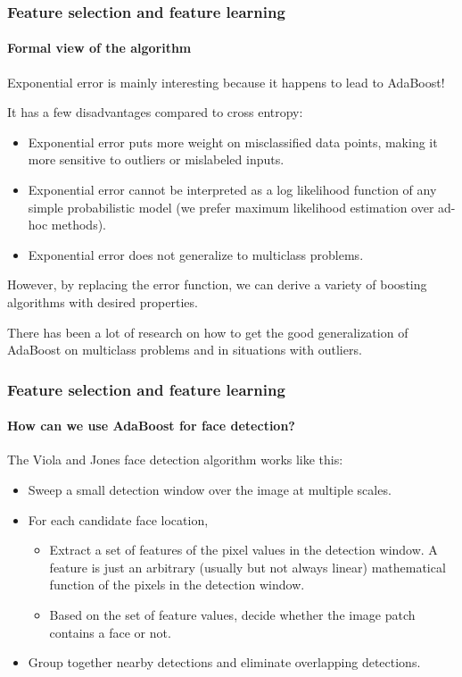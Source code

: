 \documentclass[aspectratio=169]{beamer}
\begin{document}
\begin{frame}
\frametitle{Feature selection and feature learning}
\framesubtitle{Formal view of the algorithm}

Exponential error is mainly interesting because it happens to lead to
AdaBoost!

\medskip

It has a few disadvantages compared to cross entropy:
\begin{itemize}
\item Exponential error puts \alert{more weight} on misclassified data
  points, making it \alert{more sensitive} to outliers or mislabeled
  inputs.
\item Exponential error \alert{cannot} be interpreted as a \alert{log
    likelihood} function of any simple probabilistic model (we prefer
  maximum likelihood estimation over ad-hoc methods).
\item Exponential error does not generalize to \alert{multiclass}
  problems.
\end{itemize}

\medskip

However, by replacing the error function, we can derive a variety of
boosting algorithms with desired properties.

\medskip

There has been a lot of research on how to get the good generalization
of AdaBoost on multiclass problems and in situations with outliers.

\end{frame}


\begin{frame}
\frametitle{Feature selection and feature learning}
\framesubtitle{How can we use AdaBoost for face detection?}

The Viola and Jones face detection algorithm works like this:
\begin{itemize}
\item Sweep a small \alert{detection window} over the image at multiple
  scales.
\item For each candidate face location,
  \begin{itemize}
  \item Extract a set of \alert{features}
    of the pixel values in the detection window.  A feature is just an
    arbitrary (usually but not always linear)
    mathematical function of the pixels in the detection window.
  \item Based on the set of feature values, \alert{decide}
    whether the image patch
    contains a face or not.
  \end{itemize}
\item Group together nearby detections and eliminate overlapping detections.
\end{itemize}

\end{frame}
\end{document}
